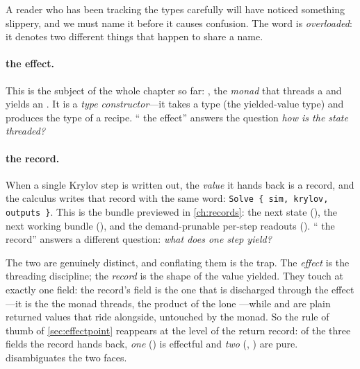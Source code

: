 A reader who has been tracking the types carefully will have noticed something
slippery, and we must name it before it causes confusion. The word  is
\emph{overloaded}: it denotes two different things that happen to share a name.

\paragraph{ the effect.} This is the subject of the whole chapter so far:
, the \emph{monad} that threads a
 and yields an . It is a \emph{type constructor}---it takes a
type  (the yielded-value type) and produces the type of a recipe. ``
the effect'' answers the question \emph{how is the state threaded?}

\paragraph{ the record.} When a single Krylov step is written out, the
\emph{value} it hands back is a record, and the calculus writes that record with the
same word: \lstinline[style=l4style]|Solve { sim, krylov, outputs }|. This is the
 bundle previewed in \cref{ch:records}: the next state (),
the next working bundle (), and the demand-prunable per-step readouts
(). `` the record'' answers a different question: \emph{what
does one step yield?}

\noindent The two are genuinely distinct, and conflating them is the trap. The
\emph{effect} is the threading discipline; the \emph{record} is the shape of the value
yielded. They touch at exactly one field: the record's  field is the one
that is discharged through the effect---it is the  the monad threads,
the product of the lone ---while  and  are
plain returned values that ride alongside, untouched by the monad. So the rule of
thumb of \cref{sec:effectpoint} reappears at the level of the return record: of the
three fields the record hands back, \emph{one} () is effectful and \emph{two}
(, ) are pure.  disambiguates the two
faces.

